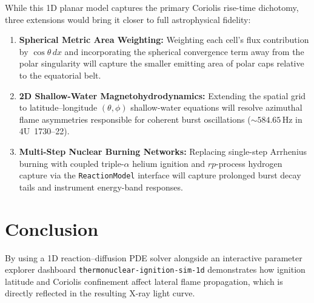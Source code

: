 \documentclass[11pt,a4paper]{article}
\begin{document}
While this 1D planar model captures the primary Coriolis rise-time dichotomy, three extensions would bring it closer to full astrophysical fidelity:
\begin{enumerate}
    \item \textbf{Spherical Metric Area Weighting:} Weighting each cell's flux contribution by $\cos\theta\,dx$ and incorporating the spherical convergence term away from the polar singularity will capture the smaller emitting area of polar caps relative to the equatorial belt.
    \item \textbf{2D Shallow-Water Magnetohydrodynamics:} Extending the spatial grid to latitude--longitude $(\theta, \phi)$ shallow-water equations \citep{Spitkovsky2002} will resolve azimuthal flame asymmetries responsible for coherent burst oscillations ($\sim 584.65\,\mathrm{Hz}$ in 4U~1730--22).
    \item \textbf{Multi-Step Nuclear Burning Networks:} Replacing single-step Arrhenius burning with coupled triple-$\alpha$ helium ignition and $rp$-process hydrogen capture via the \texttt{ReactionModel} interface will capture prolonged burst decay tails and instrument energy-band responses.
\end{enumerate}

\section{Conclusion}

By using a 1D reaction--diffusion PDE solver alongside an interactive parameter explorer dashboard \texttt{thermonuclear-ignition-sim-1d} demonstrates how ignition latitude and Coriolis confinement affect lateral flame propagation, which is directly reflected in the resulting X-ray light curve.



\end{document}
